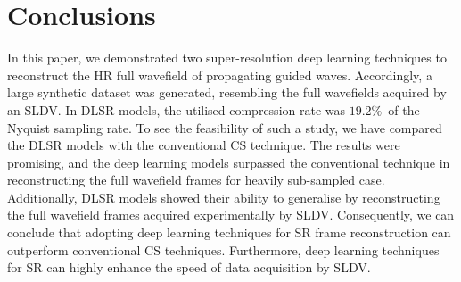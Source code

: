 \section{Conclusions}
\label{conclusion}
In this paper, we demonstrated two super-resolution deep learning techniques to reconstruct the HR full wavefield of propagating guided waves.
Accordingly, a large synthetic dataset was generated, resembling the full wavefields acquired by an SLDV.
In DLSR models, the utilised compression rate was \(19.2\%\)\ of the Nyquist sampling rate.
To see the feasibility of such a study, we have compared the DLSR models with the conventional CS technique. 
The results were promising, and the deep learning models surpassed the conventional technique in reconstructing the full wavefield frames for heavily sub-sampled case.
Additionally, DLSR models showed their ability to generalise by reconstructing the full wavefield frames acquired experimentally by SLDV.
Consequently, we can conclude that adopting deep learning techniques for SR frame reconstruction can outperform conventional CS techniques.
Furthermore, deep learning techniques for SR can highly enhance the speed of data acquisition by SLDV.

